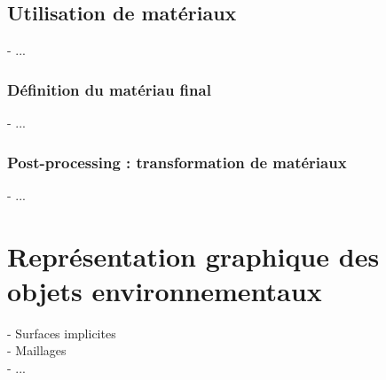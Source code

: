 \subsection{Utilisation de matériaux}
- ...

\subsubsection{Définition du matériau final}
- ...

\subsubsection{Post-processing : transformation de matériaux}
- ...



\section{Représentation graphique des objets environnementaux}
- Surfaces implicites \\
- Maillages \\
- ...
